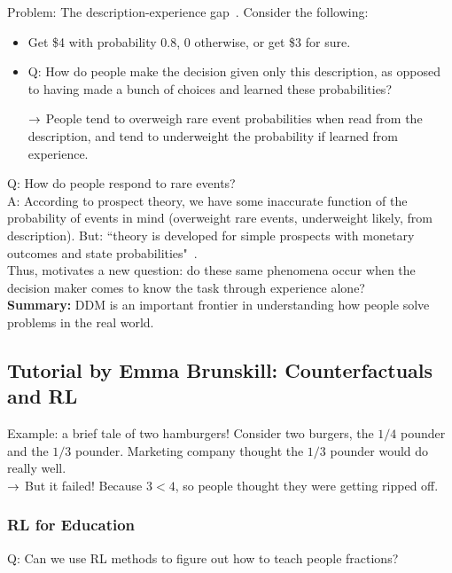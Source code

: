 Problem: The description-experience gap~\cite{hertwig2009description}. Consider the following:
\begin{itemize}
    \item Get \$4 with probability $0.8$, 0 otherwise, or get \$3 for sure. 
    \item Q: How do people make the decision given only this description, as opposed to having made a bunch of choices and learned these probabilities?
    
    $\rightarrow$ People tend to overweigh rare event probabilities when read from the description, and tend to underweight the probability if learned from experience.
\end{itemize}


Q: How do people respond to rare events? \\

A: According to prospect theory, we have some inaccurate function of the probability of events in mind (overweight rare events, underweight likely, from description). But: ``theory is developed for simple prospects with monetary outcomes and state probabilities"~\citet{kahneman2013choices}. \\

Thus, motivates a new question: do these same phenomena occur when the decision maker comes to know the task through experience alone? \\

{\bf Summary:} DDM is an important frontier in understanding how people solve problems in the real world.

\spacerule

\subsection{Tutorial by Emma Brunskill: Counterfactuals and RL}

Example: a brief tale of two hamburgers! Consider two burgers, the $1/4$ pounder and the $1/3$ pounder. Marketing company thought the $1/3$ pounder would do really well.\\

$\rightarrow$ But it failed! Because $3 < 4$, so people thought they were getting ripped off.

\subsubsection{RL for Education}

Q: Can we use RL methods to figure out how to teach people fractions? \\

